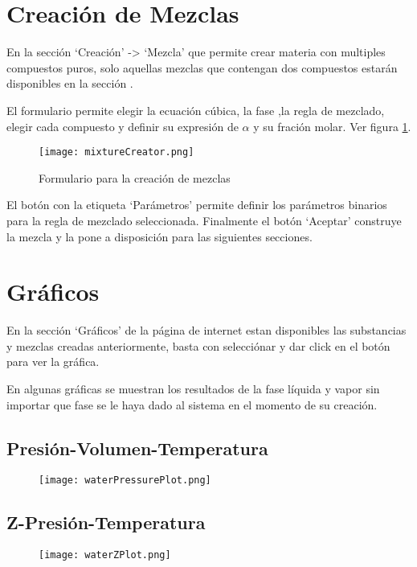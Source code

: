 \section{Creación de Mezclas}\label{sec:webMixtureCreator}

	En la sección `Creación' -> `Mezcla' que permite crear materia con multiples compuestos puros, solo aquellas mezclas que contengan dos compuestos estarán disponibles en la sección .

	El formulario permite elegir la ecuación cúbica, la fase ,la regla de mezclado, elegir cada compuesto y definir su expresión de $\alpha$ y su fración molar. Ver figura \ref{fig:webMixCreator}.

	\begin{figure}
		\texttt{[image: mixtureCreator.png]}
		\caption{Formulario para la creación de mezclas}
		\label{fig:webMixCreator}
	\end{figure}

	El botón con la etiqueta `Parámetros' permite definir los parámetros binarios para la regla de mezclado seleccionada. Finalmente el botón `Aceptar' construye la mezcla y la pone a disposición para las siguientes secciones.

\section{Gráficos}

	En la sección `Gráficos' de la página de internet estan disponibles las substancias y mezclas creadas anteriormente, basta con selecciónar y dar click en el botón para ver la gráfica.

	En algunas gráficas se muestran los resultados de la fase líquida y vapor sin importar que fase se le haya dado al sistema en el momento de su creación.

	\subsection{Presión-Volumen-Temperatura}\label{subsec:pvt}
		\begin{figure}[!h]
			\texttt{[image: waterPressurePlot.png]}
		\end{figure}
	\subsection{Z-Presión-Temperatura}\label{subsec:zpt}
		\begin{figure}[!h]
			\texttt{[image: waterZPlot.png]}
		\end{figure}
